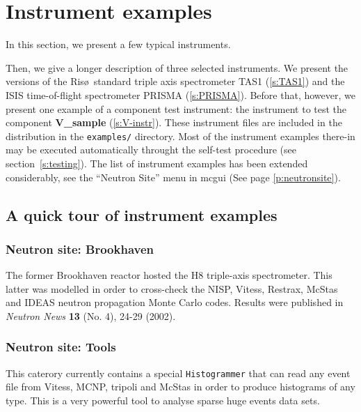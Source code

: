 
\chapter{Instrument examples}
\label{s:instrument}

In this section, we present a few typical instruments.

Then, we give a longer description of three selected
instruments. We present the \MCS versions of
the Ris\o\ standard triple axis spectrometer TAS1 (\ref{s:TAS1})
and the ISIS time-of-flight spectrometer PRISMA (\ref{s:PRISMA}).
Before that, however, we present one example of a component
test instrument: the instrument to test the component
{\bf V\_sample} (\ref{s:V-instr}).
%
These instrument files are included in the \MCS distribution
in the \verb+examples/+ directory.
Most of the instrument examples there-in may be executed automatically throught the \MCS self-test procedure (see section~\ref{s:testing}).
The list of instrument examples has been extended considerably, see
the ``Neutron Site'' menu in mcgui (See page \ref{p:neutronsite}).

\section{A quick tour of instrument examples}
\label{s:quick-tour-instr}

\subsection{Neutron site: Brookhaven}

The former Brookhaven reactor hosted the H8 triple-axis spectrometer. This latter was modelled in order to cross-check the NISP, Vitess, Restrax, McStas and IDEAS neutron propagation Monte Carlo codes. Results were published in {\it Neutron News} {\bf 13} (No. 4), 24-29 (2002).

\subsection{Neutron site: Tools}

This caterory currently contains a special \verb+Histogrammer+ that can read any event file from Vitess, MCNP, tripoli and McStas in order to produce histograms of any type. This is a very powerful tool to analyse sparse huge events data sets.

